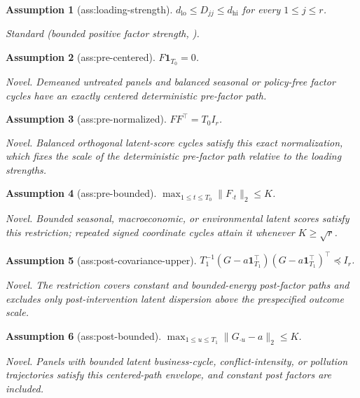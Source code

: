 \documentclass{article}
\newtheorem{assumption}{Assumption}
\begin{document}
\begin{assumption}[ass:loading-strength]\label{ass:loading-strength}
\(d_{\mathrm{lo}}\le D_{jj}\le d_{\mathrm{hi}}\) for every \(1\le j\le r\).
\par\smallskip\noindent\emph{Standard} (bounded positive factor strength, \cite{HeLiShiMiao2026}).
\end{assumption}

\begin{assumption}[ass:pre-centered]\label{ass:pre-centered}
\(F\mathbf 1_{T_0}=0\).
\par\smallskip\noindent\emph{Novel.} Demeaned untreated panels and balanced seasonal or policy-free factor cycles have an exactly centered deterministic pre-factor path.
\end{assumption}

\begin{assumption}[ass:pre-normalized]\label{ass:pre-normalized}
\(FF^{\top}=T_0I_r\).
\par\smallskip\noindent\emph{Novel.} Balanced orthogonal latent-score cycles satisfy this exact normalization, which fixes the scale of the deterministic pre-factor path relative to the loading strengths.
\end{assumption}

\begin{assumption}[ass:pre-bounded]\label{ass:pre-bounded}
\(\max_{1\le t\le T_0}\|F_{\cdot t}\|_2\le K\).
\par\smallskip\noindent\emph{Novel.} Bounded seasonal, macroeconomic, or environmental latent scores satisfy this restriction; repeated signed coordinate cycles attain it whenever \(K\ge\sqrt r\).
\end{assumption}

\begin{assumption}[ass:post-covariance-upper]\label{ass:post-covariance-upper}
\(T_1^{-1}(G-a\mathbf 1_{T_1}^{\top})(G-a\mathbf 1_{T_1}^{\top})^{\top}\preceq I_r\).
\par\smallskip\noindent\emph{Novel.} The restriction covers constant and bounded-energy post-factor paths and excludes only post-intervention latent dispersion above the prespecified outcome scale.
\end{assumption}

\begin{assumption}[ass:post-bounded]\label{ass:post-bounded}
\(\max_{1\le u\le T_1}\|G_{\cdot u}-a\|_2\le K\).
\par\smallskip\noindent\emph{Novel.} Panels with bounded latent business-cycle, conflict-intensity, or pollution trajectories satisfy this centered-path envelope, and constant post factors are included.
\end{assumption}
\end{document}
